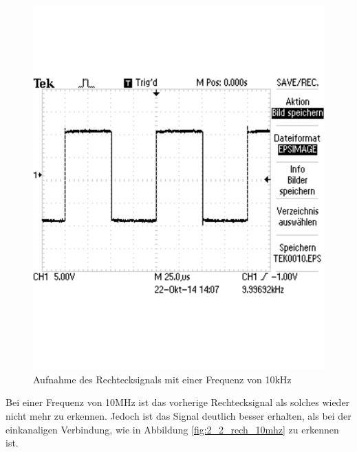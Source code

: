 \documentclass[12pt,a4paper]{article}
\begin{document}
\begin{figure}[H] 
  \centering
    \includegraphics[scale = 0.4]{2_2_rech_10khz.pdf}
  	\caption[Aufnahme des Rechtecksignals mit einer Frequenz von 10kHz]{Aufnahme des Rechtecksignals mit einer Frequenz von 10kHz}
  \label{fig:2_2_rech_10khz}
\end{figure}

Bei einer Frequenz von 10MHz ist das vorherige Rechtecksignal als solches wieder nicht mehr zu erkennen. Jedoch ist das Signal deutlich besser erhalten, als bei der einkanaligen Verbindung, wie in Abbildung \ref{fig:2_2_rech_10mhz} zu erkennen ist.
\end{document}
